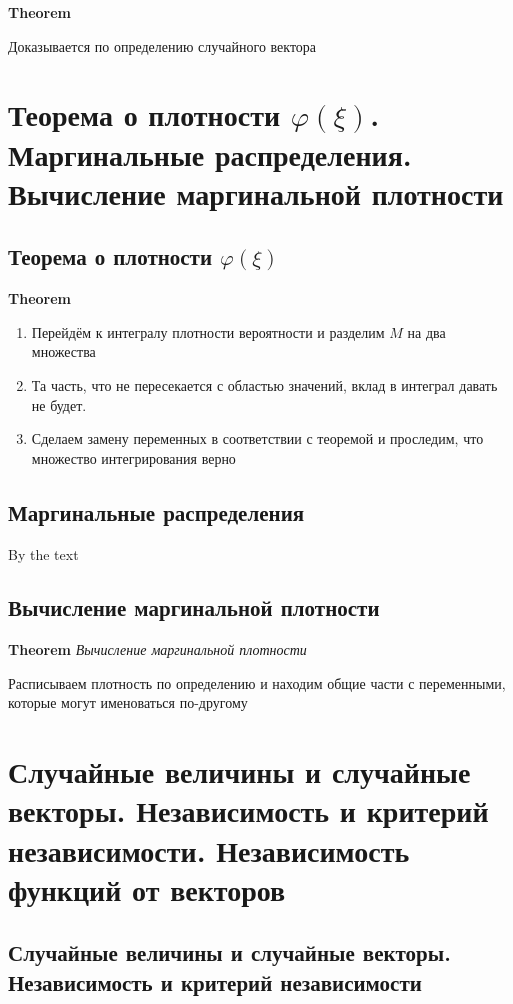 \documentclass[a4paper, 14pt]{article}
\begin{document}
    \textbf{Theorem}
    
    Доказывается по определению случайного вектора
    
    \section{Теорема о плотности $\varphi(\xi)$.
    Маргинальные распределения.
    Вычисление маргинальной плотности}
    
    \subsection{Теорема о плотности $\varphi(\xi)$}
    
    \textbf{Theorem}
    
    \begin{enumerate}
        \item Перейдём к интегралу плотности вероятности и разделим $M$ на два множества
        \item Та часть, что не пересекается с областью значений, вклад в интеграл давать не будет.
        \item Сделаем замену переменных в соответствии с теоремой и проследим, что множество интегрирования верно
    \end{enumerate}
    
    \subsection{Маргинальные распределения}
    
    By the text
    
    \subsection{Вычисление маргинальной плотности}
    
    \textbf{Theorem} \textit{Вычисление маргинальной плотности}
    
    Расписываем плотность по определению и находим общие части с переменными, которые могут именоваться по-другому
    
    \section{Случайные величины и случайные векторы.
    Независимость и критерий независимости.
    Независимость функций от векторов}
    
    \subsection{Случайные величины и случайные векторы. Независимость и критерий независимости}
    
\end{document}
